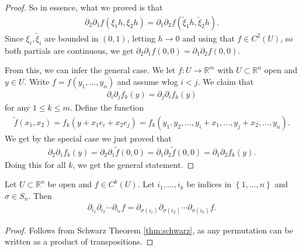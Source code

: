 \begin{proof}
    So in essence, what we proved is that 
    \begin{align*}
        \partial_{2} \partial_{1} f(\xi_{1}h, \xi_{2}h) = \partial_{1} \partial_{2} f(\tilde{\xi}_{1} h, \tilde{\xi}_{2} h). 
    \end{align*}
    Since $\xi_{i}, \tilde{\xi}_{i}$ are bounded in $(0,1)$, letting $h \to 0$ and using that $f \in C^{2}(U)$, so both partials are continuous, we get $\partial_{2} \partial_{1}f(0,0) = \partial_{1} \partial_{2} f(0,0)$. 

    From this, we can infer the general case. We let $f: U \to  \mathbb{R}^{m}$ with $U \subset \mathbb{R}^{n}$ open and $y \in U$. Write $f = f(y_{1}, \dots, y_{n})$ and assume wlog $i < j$. We claim that 
    \begin{align*}
        \partial_{i} \partial_{j} f_{k}(y) = \partial_{j} \partial_{i} f_{k}(y)
    \end{align*}
    for any $1 \leq k \leq m$. Define the function 
    \begin{align*}
        \tilde{f}(x_{1}, x_{2}) = f_{k}(y + x_{1}e_{i} + x_{2} e_{j}) = f_{k}(y_{1}, y_{2}, \dots, y_{i} + x_{1}, \dots, y_{j} + x_{2}, \dots, y_{n}).  
    \end{align*}
    We get by the special case we just proved that
    \begin{align*}
        \partial_{2} \partial_{1} f_{k}(y) = \partial_{2} \partial_{1} \tilde{f}(0,0) = \partial_{1} \partial_{2} \tilde{f}(0,0) = \partial_{1} \partial_{2} f_{k}(y).
    \end{align*}
    Doing this for all $k$, we get the general statement.
\end{proof}

\begin{corollary}\label{cor:perm_partials}
    Let $U \subset \mathbb{R}^{n}$ be open and $f \in C^{k}(U)$. Let $i_{1}, \dots, i_{k}$ be indices in $\left\{ 1, \dots, n \right\}$ and $\sigma \in S_{n}$. Then
    \begin{align*}
        \partial_{i_{1}} \partial_{i_{2}} \cdots \partial_{i_{k}} f = \partial_{\sigma (i_{1})} \partial_{\sigma (i_{2})} \cdots \partial_{\sigma (i_{k})} f.
    \end{align*}
\end{corollary}
\begin{proof}
    Follows from Schwarz Theorem \ref{thm:schwarz}, as any permutation can be written as a product of transpositions.
\end{proof}

